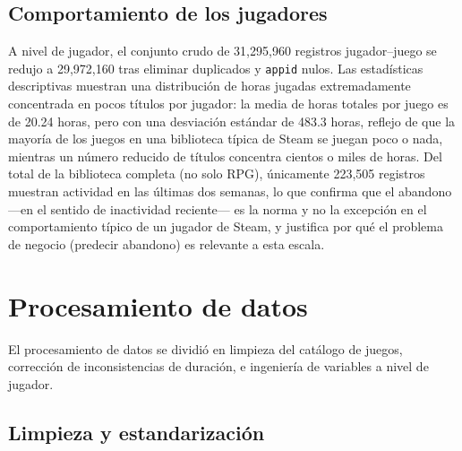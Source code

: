 \documentclass[11pt,letterpaper]{article}
\newcommand{\code}[1]{\texttt{\small #1}}
\begin{document}
\subsection{Comportamiento de los jugadores}

A nivel de jugador, el conjunto crudo de 31{,}295{,}960 registros jugador--juego se redujo a 29{,}972{,}160 tras eliminar duplicados y \code{appid} nulos. Las estadísticas descriptivas muestran una distribución de horas jugadas extremadamente concentrada en pocos títulos por jugador: la media de horas totales por juego es de 20.24 horas, pero con una desviación estándar de 483.3 horas, reflejo de que la mayoría de los juegos en una biblioteca típica de Steam se juegan poco o nada, mientras un número reducido de títulos concentra cientos o miles de horas. Del total de la biblioteca completa (no solo RPG), únicamente 223{,}505 registros muestran actividad en las últimas dos semanas, lo que confirma que el abandono ---en el sentido de inactividad reciente--- es la norma y no la excepción en el comportamiento típico de un jugador de Steam, y justifica por qué el problema de negocio (predecir abandono) es relevante a esta escala.

\section{Procesamiento de datos}
\label{sec:procesamiento}

El procesamiento de datos se dividió en limpieza del catálogo de juegos, corrección de inconsistencias de duración, e ingeniería de variables a nivel de jugador.

\subsection{Limpieza y estandarización}
\end{document}
